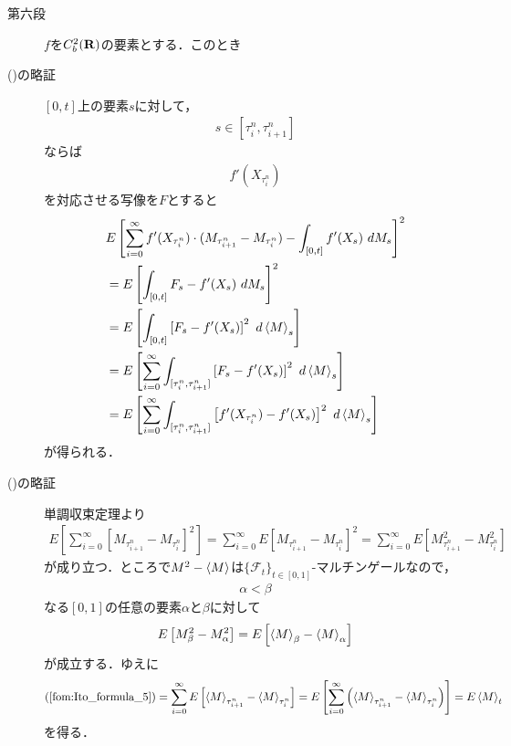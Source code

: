 \begin{sketch}
\begin{description}
			\item[第六段]
				$f$を$C^{2}_{b}(\mathbf{R})$の要素とする．このとき
				
			\item[()の略証]
				$[0,t]$上の要素$s$に対して，
				\begin{align}
					s \in \left[\tau^{n}_{i},\tau^{n}_{i+1}\right]
				\end{align}
				ならば
				\begin{align}
					f'(X_{\tau^{n}_{i}})
				\end{align}
				を対応させる写像を$F$とすると
				\begin{align}
					&E\left[\sum_{i=0}^{\infty} f'(X_{\tau^{n}_{i}}) \cdot (M_{\tau^{n}_{i+1}} - M_{\tau^{n}_{i}}) - \int_{[0,t]} f'(X_{s})\ dM_{s}\right]^{2} \\
					&= E\left[\int_{[0,t]} F_{s} - f'(X_{s})\ dM_{s}\right]^{2} \\
					&= E\left[\int_{[0,t]} \left[F_{s} - f'(X_{s})\right]^{2}\ d\inprod<M>_{s}\right] \\
					&= E\left[\sum_{i=0}^{\infty} \int_{[\tau^{n}_{i},\tau^{n}_{i+1}]} \left[F_{s} - f'(X_{s})\right]^{2}\ d\inprod<M>_{s}\right] \\
					&= E\left[\sum_{i=0}^{\infty} \int_{[\tau^{n}_{i},\tau^{n}_{i+1}]} \left[f'(X_{\tau^{n}_{i}}) - f'(X_{s})\right]^{2}\ d\inprod<M>_{s}\right]
				\end{align}
				が得られる．
						
			\item[()の略証]
				単調収束定理より
				\begin{align}
					E\left[\sum_{i=0}^{\infty} \left[M_{\tau^{n}_{i+1}} - M_{\tau^{n}_{i}}\right]^{2}\right]
					= \sum_{i=0}^{\infty} E\left[M_{\tau^{n}_{i+1}} - M_{\tau^{n}_{i}}\right]^{2}
					= \sum_{i=0}^{\infty} E\left[M_{\tau^{n}_{i+1}}^{2} - M_{\tau^{n}_{i}}^{2}\right]
					\label{fom:Ito_formula_5}
				\end{align}
				が成り立つ．ところで$M^{2} - \inprod<M>$は$\{\mathscr{F}_{t}\}_{t \in [0,1]}$-マルチンゲールなので，
				\begin{align}
					\alpha < \beta
				\end{align}
				なる$[0,1]$の任意の要素$\alpha$と$\beta$に対して
				\begin{align}
					E\left[M_{\beta}^{2} - M_{\alpha}^{2}\right]
					= E\left[\inprod<M>_{\beta} - \inprod<M>_{\alpha}\right]
				\end{align}
				が成立する．ゆえに
				\begin{align}
					(\refeq{fom:Ito_formula_5})
					= \sum_{i=0}^{\infty} E\left[\inprod<M>_{\tau^{n}_{i+1}} - \inprod<M>_{\tau^{n}_{i}}\right]
					= E\left[\sum_{i=0}^{\infty} \left(\inprod<M>_{\tau^{n}_{i+1}} - \inprod<M>_{\tau^{n}_{i}}\right) \right]
					= E\inprod<M>_{t}
				\end{align}
				を得る．
				

\end{description}
\end{sketch}
